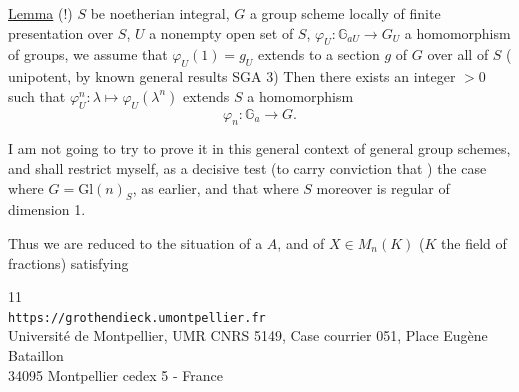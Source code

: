 \uline{Lemma} (!)  $S$ be noetherian integral, $G$ a group scheme  locally of finite presentation over $S$, $U$ a nonempty open set of $S$, $\varphi_U:\mathbb G_{aU}\longrightarrow G_U$ a homomorphism of groups, we assume that $\varphi_U(1)=g_U$ extends to a section $g$ of $G$ over all of $S$ ( unipotent, by known general results  SGA 3) Then there exists an integer $>0$ such that $\varphi_U^n:\lambda\longmapsto\varphi_U(\lambda^n)$ extends  $S$ a homomorphism
\[
\varphi_n:\mathbb G_a\longrightarrow G.
\]

I am not going to try to prove it in this general context of general group schemes, and shall restrict myself, as a decisive test (to carry conviction that ) the case where $G=\mathrm{Gl}(n)_S$, as earlier, and that where $S$ moreover is regular of dimension 1.

Thus we are reduced to the situation of a  $A$, and of $X\in M_n(K)$ ($K$ the field of fractions) satisfying

\begin{center}
\small
11\\
\texttt{https://grothendieck.umontpellier.fr}\\
Université de Montpellier, UMR CNRS 5149, Case courrier 051, Place Eugène Bataillon\\
34095 Montpellier cedex 5 - France
\end{center}

